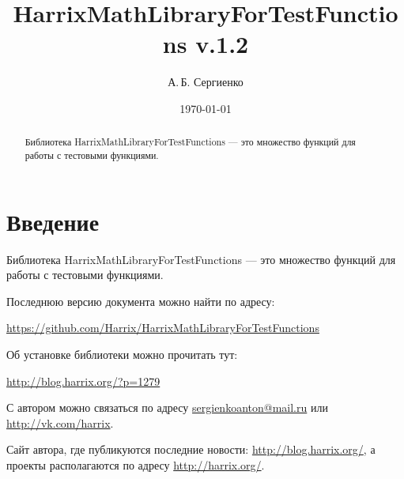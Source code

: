 \documentclass[a4paper,12pt]{article}
\title{HarrixMathLibraryForTestFunctions v.1.2}
\author{А.\,Б. Сергиенко}
\date{\today}
\begin{document}


\maketitle

\begin{abstract}
Библиотека HarrixMathLibraryForTestFunctions --- это множество функций для работы с тестовыми функциями.
\end{abstract}

\tableofcontents

\newpage

\section{Введение}

Библиотека HarrixMathLibraryForTestFunctions --- это множество функций для работы с тестовыми функциями.

Последнюю версию документа можно найти по адресу:

\href{https://github.com/Harrix/HarrixMathLibraryForTestFunctions}{https://github.com/Harrix/HarrixMathLibraryForTestFunctions}

Об установке библиотеки можно прочитать тут:

\href{http://blog.harrix.org/?p=1279}{http://blog.harrix.org/?p=1279}

С автором можно связаться по адресу \href{mailto:sergienkoanton@mail.ru}{sergienkoanton@mail.ru} или  \href{http://vk.com/harrix}{http://vk.com/harrix}.

Сайт автора, где публикуются последние новости: \href{http://blog.harrix.org/}{http://blog.harrix.org/}, а проекты располагаются по адресу \href{http://harrix.org/}{http://harrix.org/}.

\newpage
\end{document}
